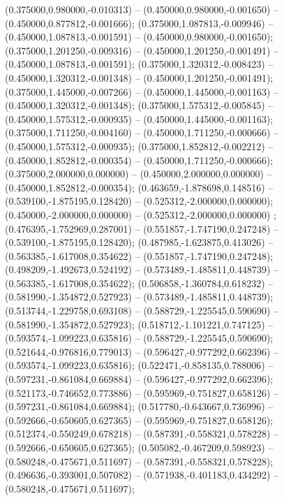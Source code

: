 (0.375000,0.980000,-0.010313) -- (0.450000,0.980000,-0.001650) -- (0.450000,0.877812,-0.001666);
 (0.375000,1.087813,-0.009946) -- (0.450000,1.087813,-0.001591) -- (0.450000,0.980000,-0.001650);
 (0.375000,1.201250,-0.009316) -- (0.450000,1.201250,-0.001491) -- (0.450000,1.087813,-0.001591);
 (0.375000,1.320312,-0.008423) -- (0.450000,1.320312,-0.001348) -- (0.450000,1.201250,-0.001491);
 (0.375000,1.445000,-0.007266) -- (0.450000,1.445000,-0.001163) -- (0.450000,1.320312,-0.001348);
 (0.375000,1.575312,-0.005845) -- (0.450000,1.575312,-0.000935) -- (0.450000,1.445000,-0.001163);
 (0.375000,1.711250,-0.004160) -- (0.450000,1.711250,-0.000666) -- (0.450000,1.575312,-0.000935);
 (0.375000,1.852812,-0.002212) -- (0.450000,1.852812,-0.000354) -- (0.450000,1.711250,-0.000666);
 (0.375000,2.000000,0.000000) -- (0.450000,2.000000,0.000000) -- (0.450000,1.852812,-0.000354);
 (0.463659,-1.878698,0.148516) -- (0.539100,-1.875195,0.128420) -- (0.525312,-2.000000,0.000000);
 (0.450000,-2.000000,0.000000) -- (0.525312,-2.000000,0.000000) ;
 (0.476395,-1.752969,0.287001) -- (0.551857,-1.747190,0.247248) -- (0.539100,-1.875195,0.128420);
 (0.487985,-1.623875,0.413026) -- (0.563385,-1.617008,0.354622) -- (0.551857,-1.747190,0.247248);
 (0.498209,-1.492673,0.524192) -- (0.573489,-1.485811,0.448739) -- (0.563385,-1.617008,0.354622);
 (0.506858,-1.360784,0.618232) -- (0.581990,-1.354872,0.527923) -- (0.573489,-1.485811,0.448739);
 (0.513744,-1.229758,0.693108) -- (0.588729,-1.225545,0.590690) -- (0.581990,-1.354872,0.527923);
 (0.518712,-1.101221,0.747125) -- (0.593574,-1.099223,0.635816) -- (0.588729,-1.225545,0.590690);
 (0.521644,-0.976816,0.779013) -- (0.596427,-0.977292,0.662396) -- (0.593574,-1.099223,0.635816);
 (0.522471,-0.858135,0.788006) -- (0.597231,-0.861084,0.669884) -- (0.596427,-0.977292,0.662396);
 (0.521173,-0.746652,0.773886) -- (0.595969,-0.751827,0.658126) -- (0.597231,-0.861084,0.669884);
 (0.517780,-0.643667,0.736996) -- (0.592666,-0.650605,0.627365) -- (0.595969,-0.751827,0.658126);
 (0.512374,-0.550249,0.678218) -- (0.587391,-0.558321,0.578228) -- (0.592666,-0.650605,0.627365);
 (0.505082,-0.467209,0.598923) -- (0.580248,-0.475671,0.511697) -- (0.587391,-0.558321,0.578228);
 (0.496636,-0.393001,0.507082) -- (0.571938,-0.401183,0.434292) -- (0.580248,-0.475671,0.511697);
